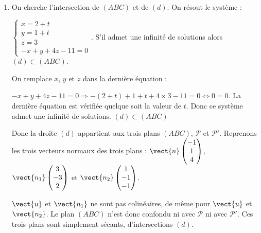 \begin{enumerate}[resume]
La droite $(d)$ passe donc par $M$ et a pour vecteur directeur $(d)~:~\vect{u}$ donc 

$\begin{cases} x=2+t\\y=1+t\\z=3\end{cases},~t\in \R$

	\item On cherche l'intersection de $(ABC)$ et de $(d)$. On résout le système : 

$\begin{cases} x=2+t\\y=1+t\\z=3\\-x+y+4z-11=0\end{cases}$. S'il admet une infinité de solutions alors $(d)\subset (ABC)$.

	On remplace $x$, $y$ et $z$ dans la dernière équation : 

	$-x+y+4z-11=0 \Rightarrow -(2+t)+1+t+4\times 3-11=0 \iff 0=0$. La dernière équation est vérifiée quelque soit la valeur de $t$. Donc ce système admet une infinité de solutions. $(d)\subset (ABC)$

	Donc la droite $(d)$ appartient aux trois plans $(ABC)$, $\mathcal{P}$ et $\mathcal{P}'$.
	Reprenons les trois vecteurs normaux des trois plans : $\vect{n}\begin{pmatrix}-1\\1\\4\end{pmatrix}$, $\vect{n_1}\begin{pmatrix}3\\-3\\2\end{pmatrix}$ et $\vect{n_2}\begin{pmatrix}1\\-1\\-1\end{pmatrix}$.
	
	$\vect{u}$ et $\vect{n_1}$ ne sont pas colinéaires, de même pour $\vect{u}$ et $\vect{n_2}$. Le plan $(ABC)$ n'est donc  confondu ni avec $\mathcal{P}$  ni avec $\mathcal{P}'$. Ces trois plans sont simplement sécants, d'intersections $(d)$.
\end{enumerate}
